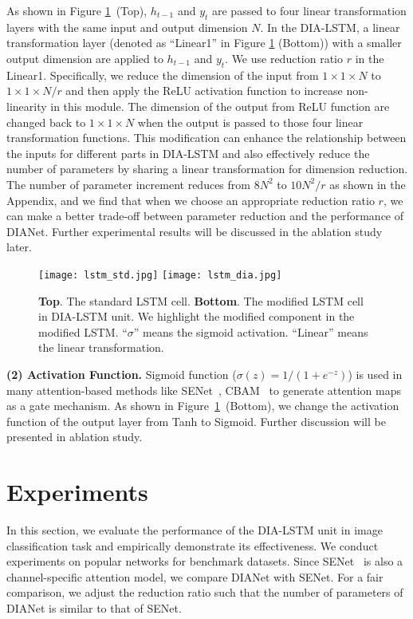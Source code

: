 \documentclass[letterpaper]{article} \usepackage{aaai20}  \usepackage{times}  \usepackage{helvet} \usepackage{courier}  \usepackage[hyphens]{url}  \usepackage{graphicx} \urlstyle{rm} \def\UrlFont{\rm}  \usepackage{graphicx}  \frenchspacing  \setlength{\pdfpagewidth}{8.5in}  \setlength{\pdfpageheight}{11in}  \usepackage{color}
\begin{document}
	As shown in Figure \ref{LSTM compare}~(Top), $h_{t-1}$ and $y_{t}$ are passed to four linear transformation layers with the same input and output dimension $N$. In the DIA-LSTM, a linear transformation layer (denoted as ``Linear1'' in Figure \ref{LSTM compare} (Bottom)) with a smaller output dimension are applied to $h_{t-1}$ and $y_{t}$. We use reduction ratio $r$ in the Linear1. Specifically, we reduce the dimension of the input  from $1 \times 1 \times N$ to $1 \times 1 \times N/r$ and then apply the ReLU activation function to increase non-linearity in this module. The dimension of the output from ReLU function are changed back to $1 \times 1 \times N$ when the output is passed to those four linear transformation functions. This modification can enhance the relationship between the inputs for different parts in DIA-LSTM and also effectively reduce the number of parameters by sharing a linear transformation for dimension reduction. The number of parameter increment reduces from $8N^2 $ to $10 N^2/r$ as shown in the Appendix, and we find that when we choose an appropriate reduction ratio $r$, we can make a better trade-off between parameter reduction and the performance of DIANet. Further experimental results will be discussed in the ablation study later.
		

	\begin{figure}[h]
		\centering
		\texttt{[image: lstm\_std.jpg]}
		\hspace{.5in}
		\texttt{[image: lstm\_dia.jpg]}
		\caption{\textbf{Top}. The standard LSTM cell. \textbf{Bottom}. The modified LSTM cell in DIA-LSTM unit. We highlight the modified component in the modified LSTM. ``$\sigma$'' means the sigmoid activation. ``Linear'' means the linear transformation.
		}
		\label{LSTM compare}
	\end{figure}

	
	\noindent\textbf{(2) Activation Function.} Sigmoid function ($\sigma(z) = 1/(1+e^{-z})$) is used in many attention-based methods like SENet~\cite{hu2018squeeze}, CBAM~\cite{woo2018cbam} to generate attention maps as a gate mechanism. As shown in Figure~\ref{LSTM compare}~(Bottom), we change the activation function of the output layer from Tanh to Sigmoid. Further discussion will be presented in ablation study.
	\section{Experiments}
	\label{experiments}
	In this section, we evaluate the performance of the DIA-LSTM unit in image classification task and empirically demonstrate its effectiveness. We conduct experiments on popular networks for benchmark datasets. Since SENet~\cite{hu2018squeeze} is also a channel-specific attention model, we compare DIANet with SENet. For a fair comparison, we adjust the reduction ratio such that the number of parameters of DIANet is similar to that of SENet. 
	
\end{document}
